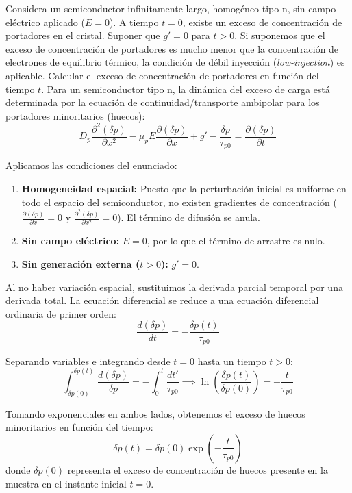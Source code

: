 \newpage

\begin{ejemplo}
Considera un semiconductor infinitamente largo, homogéneo tipo n, sin campo eléctrico aplicado ($E = 0$). A tiempo $t=0$, existe un exceso de concentración de portadores en el cristal. Suponer que $g' = 0$ para $t > 0$. Si suponemos que el exceso de concentración de portadores es mucho menor que la concentración de electrones de equilibrio térmico, la condición de débil inyección (\textit{low-injection}) es aplicable. Calcular el exceso de concentración de portadores en función del tiempo $t$.
\tcblower
Para un semiconductor tipo n, la dinámica del exceso de carga está determinada por la ecuación de continuidad/transporte ambipolar para los portadores minoritarios (huecos):
\[
D_p \frac{\partial^2 (\delta p)}{\partial x^2} - \mu_p E \frac{\partial (\delta p)}{\partial x} + g' - \frac{\delta p}{\tau_{p0}} = \frac{\partial (\delta p)}{\partial t}
\]

Aplicamos las condiciones del enunciado:
\begin{enumerate}
    \item \textbf{Homogeneidad espacial:} Puesto que la perturbación inicial es uniforme en todo el espacio del semiconductor, no existen gradientes de concentración ($\frac{\partial (\delta p)}{\partial x} = 0$ y $\frac{\partial^2 (\delta p)}{\partial x^2} = 0$). El término de difusión se anula.
    \item \textbf{Sin campo eléctrico:} $E = 0$, por lo que el término de arrastre es nulo.
    \item \textbf{Sin generación externa ($t > 0$):} $g' = 0$.
\end{enumerate}

Al no haber variación espacial, sustituimos la derivada parcial temporal por una derivada total. La ecuación diferencial se reduce a una ecuación diferencial ordinaria de primer orden:
\[
\frac{d(\delta p)}{dt} = -\frac{\delta p(t)}{\tau_{p0}}
\]

Separando variables e integrando desde $t = 0$ hasta un tiempo $t > 0$:
\[
\int_{\delta p(0)}^{\delta p(t)} \frac{d(\delta p)}{\delta p} = -\int_{0}^{t} \frac{dt'}{\tau_{p0}} \implies \ln \left( \frac{\delta p(t)}{\delta p(0)} \right) = -\frac{t}{\tau_{p0}}
\]

Tomando exponenciales en ambos lados, obtenemos el exceso de huecos minoritarios en función del tiempo:
\[
\delta p(t) = \delta p(0) \exp\left( -\frac{t}{\tau_{p0}} \right)
\]
donde $\delta p(0)$ representa el exceso de concentración de huecos presente en la muestra en el instante inicial $t = 0$.


\end{ejemplo}
